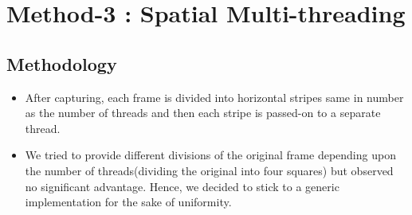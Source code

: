\documentclass[a4paper]{article}
\begin{document}
\section*{Method-3 : Spatial Multi-threading}
\subsection*{Methodology}
\begin{itemize}
    \item After capturing, each frame is divided into horizontal stripes same in number as the number of threads and then each stripe is passed-on to a separate thread. 
    \item We tried to provide different divisions of the original frame depending upon the number of threads(dividing the original into four squares) but observed no significant advantage. Hence, we decided to stick to a generic implementation for the sake of uniformity. 
\end{itemize}
\end{document}
